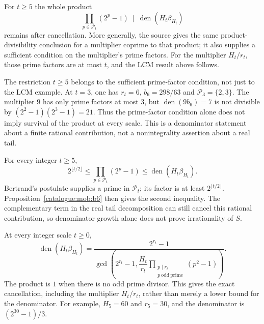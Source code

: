 \begin{prop}\label{catalogue:mob:b6}
For $t\ge5$ the whole product
\[
 \prod_{p\in\mathcal P_t}(2^p-1)
       \ \mid\ \operatorname{den}(H_t\beta_{H_t})
\]
remains after cancellation. More generally, the source gives the same
product-divisibility conclusion for a multiplier coprime to that product;
it also supplies a sufficient condition on the multiplier's prime factors.
For the multiplier $H_t/r_t$, those prime factors are at most $t$, and
the LCM result above follows.

\end{prop}

The restriction $t\ge5$ belongs to the sufficient prime-factor condition,
not just to the LCM example. At $t=3$, one has $r_t=6$,
$b_6=298/63$ and $\mathcal P_3=\{2,3\}$. The multiplier $9$ has only
prime factors at most $3$, but $\operatorname{den}(9b_6)=7$ is not
divisible by $(2^2-1)(2^3-1)=21$. Thus the prime-factor condition alone
does not imply survival of the product at every scale.
This is a denominator statement about a finite rational contribution,
not a nonintegrality assertion about a real tail.


\begin{prop}\label{catalogue:mob:b7a}
For every integer $t\ge5$,
\[
 2^{\lfloor t/2\rfloor}
 \le \prod_{p\in\mathcal P_t}(2^p-1)
 \le \operatorname{den}(H_t\beta_{H_t}).
\]
Bertrand's postulate supplies a prime in $\mathcal P_t$; its factor is
at least $2^{\lfloor t/2\rfloor}$. Proposition~\ref{catalogue:mob:b6}
then gives the second inequality. The complementary term in the real
tail decomposition can still cancel this rational contribution, so
denominator growth alone does not prove irrationality of $S$.
\end{prop}

\begin{prop}\label{catalogue:mob:b7b}
At every integer scale $t\ge0$,
\[
 \operatorname{den}(H_t\beta_{H_t})
 =\frac{2^{r_t}-1}
 {\gcd\!\left(2^{r_t}-1,
       \dfrac{H_t}{r_t}
       \prod_{\substack{p\mid r_t\\p\ \mathrm{odd\ prime}}}(p^2-1)\right)}.
\]
The product is $1$ when there is no odd prime divisor. This gives the
exact cancellation, including the multiplier $H_t/r_t$, rather than
merely a lower bound for the denominator. For example, $H_5=60$ and
$r_5=30$, and the denominator is $(2^{30}-1)/3$.
\end{prop}

